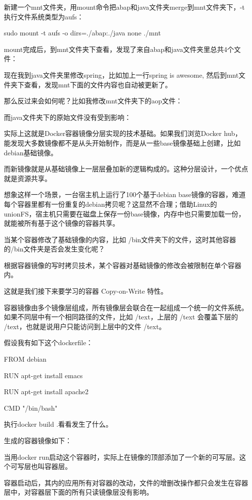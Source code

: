 新建一个mnt文件夹，用mount命令把abap和java文件夹merge到mnt文件夹下，-t执行文件系统类型为aufs：

sudo mount -t aufs -o dirs=./abap:./java none ./mnt

mount完成后，到mnt文件夹下查看，发现了来自abap和java文件夹里总共4个文件：

现在我到java文件夹里修改spring，比如加上一行spring is awesome, 然后到mnt文件夹下查看，发现mnt下面的文件内容也自动被更新了。

那么反过来会如何呢？比如我修改mnt文件夹下的aop文件：

而java文件夹下的原始文件没有受到影响：

实际上这就是Docker容器镜像分层实现的技术基础。如果我们浏览Docker hub，能发现大多数镜像都不是从头开始制作，而是从一些base镜像基础上创建，比如debian基础镜像。

而新镜像就是从基础镜像上一层层叠加新的逻辑构成的。这种分层设计，一个优点就是资源共享。

想象这样一个场景，一台宿主机上运行了100个基于debian base镜像的容器，难道每个容器里都有一份重复的debian拷贝呢？这显然不合理；借助Linux的unionFS，宿主机只需要在磁盘上保存一份base镜像，内存中也只需要加载一份，就能被所有基于这个镜像的容器共享。

当某个容器修改了基础镜像的内容，比如 /bin文件夹下的文件，这时其他容器的/bin文件夹是否会发生变化呢？

根据容器镜像的写时拷贝技术，某个容器对基础镜像的修改会被限制在单个容器内。

这就是我们接下来要学习的容器 Copy-on-Write 特性。

容器镜像由多个镜像层组成，所有镜像层会联合在一起组成一个统一的文件系统。如果不同层中有一个相同路径的文件，比如 /text，上层的 /text 会覆盖下层的 /text，也就是说用户只能访问到上层中的文件 /text。

假设我有如下这个dockerfile：

FROM debian

RUN apt-get install emacs

RUN apt-get install apache2

CMD "/bin/bash"

执行docker build .看看发生了什么。

生成的容器镜像如下：

当用docker run启动这个容器时，实际上在镜像的顶部添加了一个新的可写层。这个可写层也叫容器层。

容器启动后，其内的应用所有对容器的改动，文件的增删改操作都只会发生在容器层中，对容器层下面的所有只读镜像层没有影响。

\newpage
